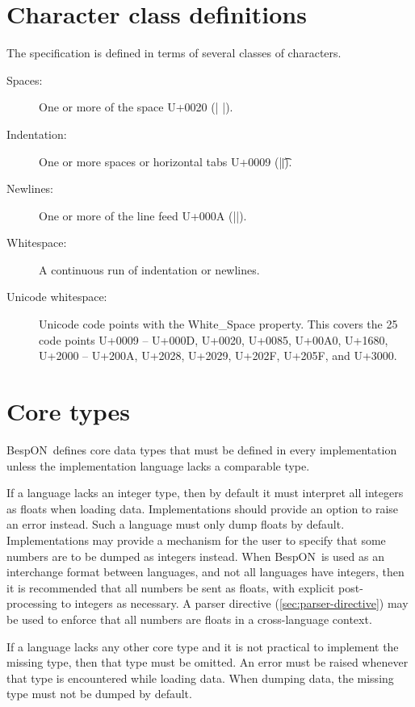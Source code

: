 \documentclass[11pt]{article}
\newcommand{\bespon}{BespON}
\begin{document}
\section{Character class definitions}
The specification is defined in terms of several classes of characters.
\begin{description}
\item[Spaces:]  One or more of the space U+0020 \begingroup{}(| |)\endgroup.
\item[Indentation:]  One or more spaces or horizontal tabs U+0009 (|\t|).
\item[Newlines:]  One or more of the line feed U+000A (|\n|).
\item[Whitespace:]  A continuous run of indentation or newlines.
\item[Unicode whitespace:]  Unicode code points with the White\_Space property.  This covers the 25 code points U+0009 -- U+000D, U+0020, U+0085, U+00A0, U+1680, U+2000 -- U+200A, U+2028, U+2029, U+202F, U+205F, and U+3000.
\end{description}





\section{Core types}

\bespon\ defines core data types that must be defined in every implementation unless the implementation language lacks a comparable type.

If a language lacks an integer type, then by default it must interpret all integers as floats when loading data.  Implementations should provide an option to raise an error instead.  Such a language must only dump floats by default.  Implementations may provide a mechanism for the user to specify that some numbers are to be dumped as integers instead.  When \bespon\ is used as an interchange format between languages, and not all languages have integers, then it is recommended that all numbers be sent as floats, with explicit post-processing to integers as necessary.  A parser directive (\cref{sec:parser-directive}) may be used to enforce that all numbers are floats in a cross-language context.

If a language lacks any other core type and it is not practical to implement the missing type, then that type must be omitted.  An error must be raised whenever that type is encountered while loading data.  When dumping data, the missing type must not be dumped by default.
\end{document}
